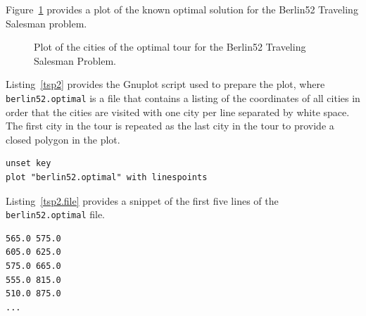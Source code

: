 Figure~\ref{plot:tsp2} provides a plot of the known optimal solution for the Berlin52 Traveling Salesman problem. 

\begin{figure}[htp]
\centering

\caption{Plot of the cities of the optimal tour for the Berlin52 Traveling Salesman Problem.}
\label{plot:tsp2}
\end{figure}

Listing~\ref{tsp2} provides the Gnuplot script used to prepare the plot, where \texttt{berlin52.optimal} is a file that contains a listing of the coordinates of all cities in order that the cities are visited with one city per line separated by white space. The first city in the tour is repeated as the last city in the tour to provide a closed polygon in the plot.

\begin{lstlisting}[caption=Gnuplot script for plotting a tour for a Traveling Salesman Problem., label=tsp2]
unset key
plot "berlin52.optimal" with linespoints
\end{lstlisting}

Listing~\ref{tsp2.file} provides a snippet of the first five lines of the \texttt{berlin52.optimal} file.

\begin{lstlisting}[caption=Snippet of the berlin52.optimal file., label=tsp2.file]
565.0 575.0
605.0 625.0
575.0 665.0
555.0 815.0
510.0 875.0
...
\end{lstlisting}